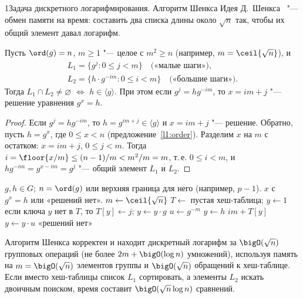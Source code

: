 \begin{lecture}{1}{Задача дискретного логарифмирования. Алгоритм Шенкса}
Идея Д.~Шенкса~\cite{shanks} "--- обмен памяти на время: составить два списка длины около
$\sqrt n$ так, чтобы их общий элемент давал логарифм.

\begin{lemma}[о коллизии]\label{l1:collision}
Пусть $\ord(g) = n$, $m \ge 1$ "--- целое с $m^2 \ge n$ (например, $m = \ceil{\sqrt n}$), и
\[
\begin{gathered}
  L_1 = \{g^j : 0 \le j < m\} \quad\text{(«малые шаги»)},\\
  L_2 = \{h \cdot g^{-im} : 0 \le i < m\} \quad\text{(«большие шаги»)}.
\end{gathered}
\]
Тогда $L_1 \cap L_2 \ne \varnothing$ $\iff$ $h \in \langle g \rangle$. При этом если
$g^j = h g^{-im}$, то $x = im + j$ "--- решение уравнения $g^x = h$.
\end{lemma}

\begin{proof}
Если $g^j = h g^{-im}$, то $h = g^{im + j} \in \langle g \rangle$ и $x = im + j$ "--- решение.
Обратно, пусть $h = g^x$, где $0 \le x < n$ (предложение~\ref{l1:order}). Разделим $x$ на $m$ с
остатком: $x = im + j$, $0 \le j < m$. Тогда $i = \floor{x/m} \le (n - 1)/m < m^2/m = m$, т.\,е.
$0 \le i < m$, и $h g^{-im} = g^{x - im} = g^j$ "--- общий элемент $L_1$ и $L_2$.
\end{proof}

\begin{algorithm}[Шенкс]\label{l1:bsgs}
\begin{algorithmic}[1]
\Require $g, h \in G$; $n = \ord(g)$ или верхняя граница для него (например, $p - 1$).
\Ensure $x$ с $g^x = h$ или «решений нет».
\State $m \gets \ceil{\sqrt n}$
\State $T \gets$ пустая хеш-таблица; $y \gets 1$
 
  \State если ключа $y$ нет в $T$, то $T[y] \gets j$; \quad $y \gets y \cdot g$
\EndFor
\State $u \gets g^{-m}$ 
\State $y \gets h$
 
   \Return $im + T[y]$ \EndIf
  \State $y \gets y \cdot u$
\EndFor
\State \Return «решений нет»
\end{algorithmic}
\end{algorithm}

\begin{theorem}\label{l1:bsgs-complexity}
Алгоритм Шенкса корректен и находит дискретный логарифм за $\bigO(\sqrt n)$ групповых
операций (не более $2m + \bigO(\log n)$ умножений), используя память на $m = \bigO(\sqrt n)$
элементов группы и $\bigO(\sqrt n)$ обращений к хеш-таблице. Если вместо хеш-таблицы список $L_1$
сортировать, а элементы $L_2$ искать двоичным поиском, время составит
$\bigO(\sqrt n \log n)$ сравнений.
\end{theorem}


\end{lecture}
